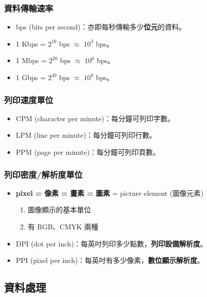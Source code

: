 \documentclass[12pt,a4paper,oneside]{report}
\begin{document}
\begin{CJK}{UTF8}{bkai}
\subsubsection{資料傳輸速率}
\begin{itemize}
\item bps (bits per second)：亦即每秒傳輸多少\textbf{位元}的資料。
\item 1 Kbps = $2^{10}$ bps $\approx$ $10^{3}$ bps。
\item 1 Mbps = $2^{20}$ bps $\approx$ $10^{6}$ bps。
\item 1 Gbps = $2^{30}$ bps $\approx$ $10^{9}$ bps。
\end{itemize}

\subsubsection{列印速度單位}
\begin{itemize}
\item CPM (character per minute)：每分鐘可列印字數。
\item LPM (line per minute)：每分鐘可列印行數。
\item PPM (page per minute)：每分鐘可列印頁數。
\end{itemize}

\subsubsection{列印密度/解析度單位}
\begin{itemize}
\item \textbf{pixel = 像素 = 畫素 = 圖素} = picture element (圖像元素)
  \begin{enumerate}
  \item 圖像顯示的基本單位
  \item 有 RGB、CMYK 兩種
  \end{enumerate}
\item DPI (dot per inch)：每英吋列印多少點數，\textbf{列印設備解析度}。
\item PPI (pixel per inch)：每英吋有多少像素，\textbf{數位顯示解析度}。
\end{itemize}

\subsection{資料處理}


\end{CJK}
\end{document}
